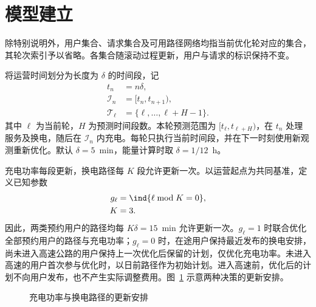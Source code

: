 \section{模型建立}

除特别说明外，用户集合、请求集合及可用路径网络均指当前优化轮对应的集合，其轮次索引予以省略。各集合随滚动过程更新，用户与请求的标识保持不变。

将运营时间划分为长度为 $\delta$ 的时间段，记
\begin{subequations}\label{eq:time_grid}
\begin{align}
t_n&=n\delta,\label{eq:time_points}\\
\mathcal I_n&=[t_n,t_{n+1}),\label{eq:time_intervals}\\
\mathcal T_\ell&=\{\ell,\ldots,\ell+H-1\}.\label{eq:prediction_indices}
\end{align}
\end{subequations}
其中 $\ell$ 为当前轮，$H$ 为预测时间段数。本轮预测范围为 $[t_\ell,t_{\ell+H})$，在 $t_n$ 处理服务及换电，随后在 $\mathcal I_n$ 内充电。每轮只执行当前时间段，并在下一时刻使用新观测重新优化。默认 $\delta=5$~min，能量计算时取 $\delta=1/12$~h。

充电功率每段更新，换电路径每 $K$ 段允许更新一次。以运营起点为共同基准，定义已知参数
\begin{subequations}\label{eq:update_clock}
\begin{align}
g_\ell&=\ind\{\ell\bmod K=0\},\label{eq:path_update_indicator}\\
K&=3.\label{eq:path_update_interval}
\end{align}
\end{subequations}
因此，两类预约用户的路径均每 $K\delta=15$~min 允许更新一次。$g_\ell=1$ 时联合优化全部预约用户的路径与充电功率；$g_\ell=0$ 时，在途用户保持最近发布的换电安排，尚未进入高速公路的用户保持上一次优化后保留的计划，仅优化充电功率。未进入高速的用户首次参与优化时，以日前路径作为初始计划。进入高速前，优化后的计划不向用户发布，也不产生实际调整费用。图~\ref{fig:updates} 示意两种决策的更新安排。

\begin{figure}[!htbp]
\centering
{}
\caption{充电功率与换电路径的更新安排}
\label{fig:updates}
\end{figure}

